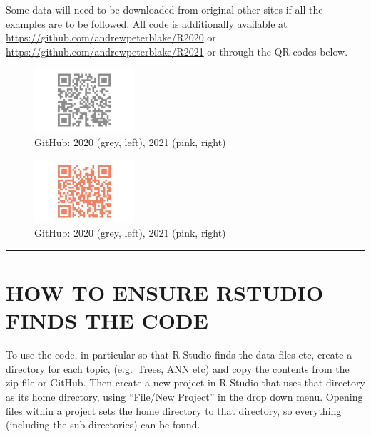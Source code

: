 \documentclass[
  letterpaper,
]{book}
\begin{document}
Some data will need to be downloaded from original other sites if all
the examples are to be followed. All code is additionally available at
\url{https://github.com/andrewpeterblake/R2020} or
\url{https://github.com/andrewpeterblake/R2021} or through the QR codes
below.

\begin{figure}

{\centering \includegraphics[width=0.33\textwidth,height=\textheight]{./R2021_files/figure-pdf/unnamed-chunk-1-1.pdf}

}

\caption{GitHub: 2020 (grey, left), 2021 (pink, right)}

\end{figure}

\begin{figure}

{\centering \includegraphics[width=0.33\textwidth,height=\textheight]{./R2021_files/figure-pdf/unnamed-chunk-1-2.pdf}

}

\caption{GitHub: 2020 (grey, left), 2021 (pink, right)}

\end{figure}

\begin{center}\rule{0.5\linewidth}{0.5pt}\end{center}

\hypertarget{how-to-ensure-rstudio-finds-the-code}{%
\section{HOW TO ENSURE RSTUDIO FINDS THE
CODE}\label{how-to-ensure-rstudio-finds-the-code}}

To use the code, in particular so that R Studio finds the data files
etc, create a directory for each topic, (e.g.~Trees, ANN etc) and copy
the contents from the zip file or GitHub. Then create a new project in R
Studio that uses that directory as its home directory, using ``File/New
Project'' in the drop down menu. Opening files within a project sets the
home directory to that directory, so everything (including the
sub-directories) can be found.
\end{document}
